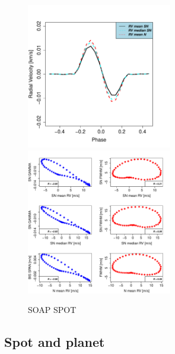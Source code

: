 \documentclass[11pt, oneside]{article}
\begin{document}
\begin{figure}[htbp]
   \centering
\includegraphics[height = 2.5in]{RV_comparison_SPOT.pdf} 
\includegraphics[height = 2.5in]{SOAP_SPOT_Comparison_para_SN.pdf} 
   \caption{SOAP SPOT}
    \label{fig:spot}
\end{figure}

\subsection{Spot and planet} \label{sec:soap.spot.planet}
\end{document}
